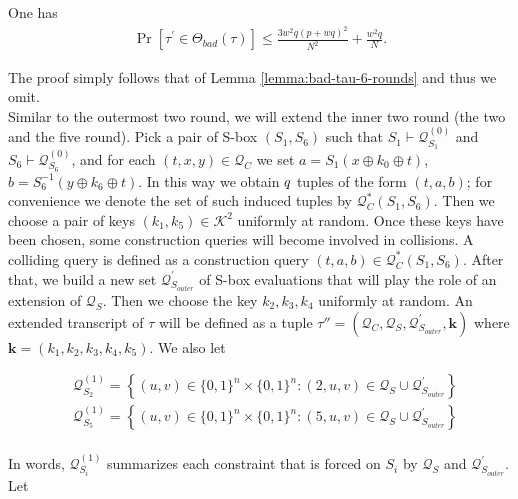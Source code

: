 \begin{lemma}
	\label{lemma:bad-tau-6-rounds}
	
	One has
	\begin{align}
	\operatorname{Pr}[\tau^{\prime} \in \Theta_{bad}(\tau)] \leq \frac{3w^{2} q \left(p+w q\right)^{2}}{N^{2}} + \frac{w^{2} q}{N}.
	\label{eq:bound-bad-tau-6-rounds}
	\end{align}
\end{lemma}
The proof simply follows that of Lemma \ref{lemma:bad-tau-6-rounds} and thus we omit.		\\




Similar to the outermost two round, we will extend the inner two round (the two and the five round).  Pick a pair of S-box $(S_1, S_6)$ such that $S_{1} \vdash \mathcal{Q}_{S_{1}}^{(0)}$ and $S_{6} \vdash \mathcal{Q}_{S_{6}}^{(0)}$, and for each $ (t, x, y) \in \mathcal{Q}_{C}$ we set $a=S_{1}\left(x \oplus k_{0} \oplus t\right)$, $b=S_{6}^{-1}\left(y \oplus k_{6} \oplus t\right)$. In this way we obtain $\mathnormal{q}$ tuples of the form $(t, a, b)$; for convenience we denote the set of such induced tuples by $\mathcal{Q}_{C}^{*}\left(S_{1}, S_{6}\right)$. Then we choose a pair of keys $\left(k_{1}, k_{5}\right) \in \mathcal{K}^{2}$ uniformly at random. Once these keys have been chosen, some construction queries will become involved in collisions. A colliding query is defined as a construction query $(t, a, b) \in \mathcal{Q}_{C}^{*}\left(S_{1}, S_{6}\right)$. After that, we build a new set $\mathcal{Q}_{S_{outer}}^{\prime}$ of S-box evaluations that will play the role of an extension of $\mathcal{Q}_{S}$. Then we choose the key $k_2, k_3, k_4$ uniformly at random. An extended transcript of $\tau$ will be defined as a tuple $\tau''=\left(\mathcal{Q}_{C}, \mathcal{Q}_{S}, \mathcal{Q}_{S_{outer}}^{\prime}, \mathbf{k}\right)$ where $\mathbf{k}=\left(k_{1}, k_{2},k_{3},k_{4}, k_{5}\right)$. We also let

$$
\begin{aligned}
&\mathcal{Q}_{S_{2}}^{(1)}=\left\{(u, v) \in\{0,1\}^{n} \times\{0,1\}^{n}:(2, u, v) \in \mathcal{Q}_{S} \cup \mathcal{Q}_{S_{outer}}^{\prime}\right\}\\
&\mathcal{Q}_{S_{5}}^{(1)}=\left\{(u, v) \in\{0,1\}^{n} \times\{0,1\}^{n}:(5, u, v) \in \mathcal{Q}_{S} \cup \mathcal{Q}_{S_{outer}}^{\prime}\right\}\\
\end{aligned}
$$

\noindent In words, $\mathcal{Q}_{S_{i}}^{(1)}$ summarizes each constraint that is forced on $S_{i}$ by $\mathcal{Q}_{S}$ and $\mathcal{Q}_{S_{outer}}^{\prime}$. Let

